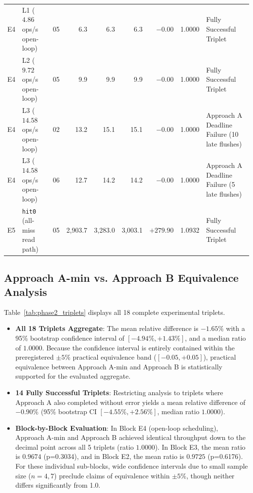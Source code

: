 \documentclass[conference]{IEEEtran}
\begin{document}
\begin{table}[t]
\begin{tabular}{@{}llrrrrrrl@{}}
E4 & L1 ($4.86$ ops/s open-loop) & 05 & 6.3 & 6.3 & 6.3 & $-0.00$ & 1.0000 & Fully Successful Triplet \\
E4 & L2 ($9.72$ ops/s open-loop) & 05 & 9.9 & 9.9 & 9.9 & $-0.00$ & 1.0000 & Fully Successful Triplet \\
E4 & L3 ($14.58$ ops/s open-loop) & 02 & 13.2 & 15.1 & 15.1 & $-0.00$ & 1.0000 & Approach A Deadline Failure (10 late flushes) \\
E4 & L3 ($14.58$ ops/s open-loop) & 06 & 12.7 & 14.2 & 14.2 & $-0.00$ & 1.0000 & Approach A Deadline Failure (5 late flushes) \\
E5 & \texttt{hit0} (all-miss read path) & 05 & 2,903.7 & 3,283.0 & 3,003.1 & $+279.90$ & 1.0932 & Fully Successful Triplet \\
\bottomrule
\end{tabular}
\end{table}

\subsection{Approach A-min vs. Approach B Equivalence Analysis}
Table~\ref{tab:phase2_triplets} displays all 18 complete experimental triplets.
\begin{itemize}
    \item \textbf{All 18 Triplets Aggregate}: The mean relative difference is $\mathbf{-1.65\%}$ with a 95\% bootstrap confidence interval of $\mathbf{[-4.94\%, +1.43\%]}$, and a median ratio of $\mathbf{1.0000}$. Because the confidence interval is entirely contained within the preregistered $\pm 5\%$ practical equivalence band ($[-0.05, +0.05]$), practical equivalence between Approach A-min and Approach B is statistically supported for the evaluated aggregate.
    \item \textbf{14 Fully Successful Triplets}: Restricting analysis to triplets where Approach A also completed without error yields a mean relative difference of $\mathbf{-0.90\%}$ (95\% bootstrap CI $\mathbf{[-4.55\%, +2.56\%]}$, median ratio $1.0000$).
    \item \textbf{Block-by-Block Evaluation}: In Block E4 (open-loop scheduling), Approach A-min and Approach B achieved identical throughput down to the decimal point across all 5 triplets (ratio $1.0000$). In Block E3, the mean ratio is $0.9674$ (p=0.3034), and in Block E2, the mean ratio is $0.9725$ (p=0.6176). For these individual sub-blocks, wide confidence intervals due to small sample size ($n=4, 7$) preclude claims of equivalence within $\pm 5\%$, though neither differs significantly from 1.0.
\end{itemize}
\end{document}

